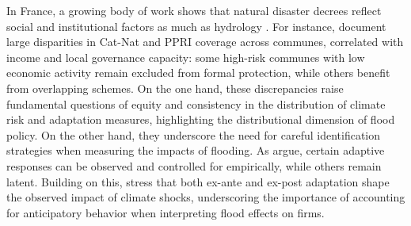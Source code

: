 In France, a growing body of work shows that natural disaster decrees reflect social and institutional factors as much as hydrology \citep{CHELLE20251, morvan2022municipalities, grislain2018natural, boissier2013mortalite, bezy2023incidence}. For instance, \citet{CHELLE20251} document large disparities in Cat-Nat and PPRI coverage across communes, correlated with income and local governance capacity: some high-risk communes with low economic activity remain excluded from formal protection, while others benefit from overlapping schemes. On the one hand, these discrepancies raise fundamental questions of equity and consistency in the distribution of climate risk and adaptation measures, highlighting the distributional dimension of flood policy. On the other hand, they underscore the need for careful identification strategies when measuring the impacts of flooding. As \citet{lemoine2018estimating} argue, certain adaptive responses can be observed and controlled for empirically, while others remain latent. Building on this, \citet{carleton2024adaptation} stress that both ex-ante and ex-post adaptation shape the observed impact of climate shocks, underscoring the importance of accounting for anticipatory behavior when interpreting flood effects on firms.





